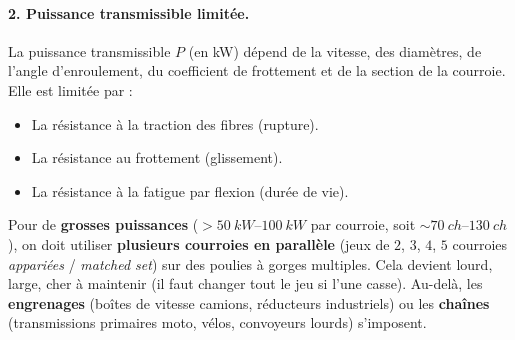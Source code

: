 \documentclass[11pt]{article}
\begin{document}
\paragraph{2. Puissance transmissible limitée.}
La puissance transmissible $P$ (en kW) dépend de la vitesse, des diamètres, de l'angle d'enroulement, du coefficient de frottement et de la section de la courroie. Elle est limitée par :
\begin{itemize}
    \item La résistance à la traction des fibres (rupture).
    \item La résistance au frottement (glissement).
    \item La résistance à la fatigue par flexion (durée de vie).
\end{itemize}
Pour de \textbf{grosses puissances} ($> \SIrange{50}{100}{kW}$ par courroie, soit $\sim \SIrange{70}{130}{ch}$), on doit utiliser \textbf{plusieurs courroies en parallèle} (jeux de $2$, $3$, $4$, $5$ courroies \emph{appariées} / \emph{matched set}) sur des poulies à gorges multiples. Cela devient lourd, large, cher à maintenir (il faut changer tout le jeu si l'une casse). Au-delà, les \textbf{engrenages} (boîtes de vitesse camions, réducteurs industriels) ou les \textbf{chaînes} (transmissions primaires moto, vélos, convoyeurs lourds) s'imposent.
\end{document}
